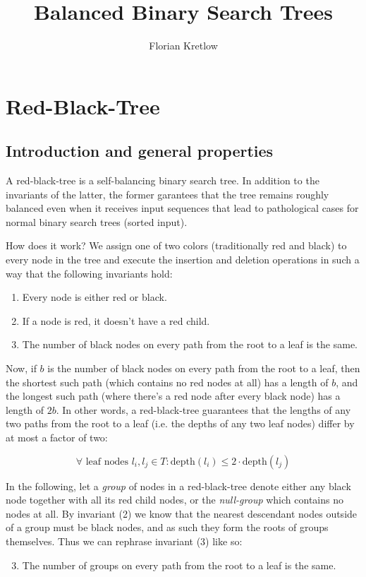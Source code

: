 \documentclass{article}
\title{Balanced Binary Search Trees}
\author{Florian Kretlow}
\begin{document}
\section{Red-Black-Tree}

\subsection{Introduction and general properties}
A red-black-tree is a self-balancing binary search tree. In addition to the invariants
of the latter, the former garantees that the tree remains roughly balanced even when it
receives input sequences that lead to pathological cases for normal binary search trees
(sorted input).

How does it work? We assign one of two colors (traditionally red and black) to every
node in the tree and execute the insertion and deletion operations in such a way that the
following invariants hold:

\begin{enumerate}[label=(\arabic*)]
\item Every node is either red or black.
\item If a node is red, it doesn't have a red child.
\item The number of black nodes on every path from the root to a leaf is the same.
\end{enumerate}

Now, if \(b\) is the number of black nodes on every path from the root to a leaf, then
the shortest such path (which contains no red nodes at all) has a length of \(b\), and
the longest such path (where there's a red node after every black node) has a length of
\(2b\). In other words, a red-black-tree guarantees that the lengths of any two paths
from the root to a leaf (i.e. the depths of any two leaf nodes) differ by at most a
factor of two:

\[
\forall \text{ leaf nodes } l_{i}, l_{j} \in T : \text{depth}(l_i) \leq 2 \cdot
\text{depth}(l_j)
\]

In the following, let a \emph{group} of nodes in a red-black-tree denote either any
black node together with all its red child nodes, or the \emph{null-group} which
contains no nodes at all.  By invariant (2) we know that the nearest descendant nodes
outside of a group must be black nodes, and as such they form the roots of groups
themselves. Thus we can rephrase invariant (3) like so:

\begin{enumerate}[label=(\arabic*)]
\setcounter{enumi}{2}
\item The number of groups on every path from the root to a leaf is the same.
\end{enumerate}
\end{document}
